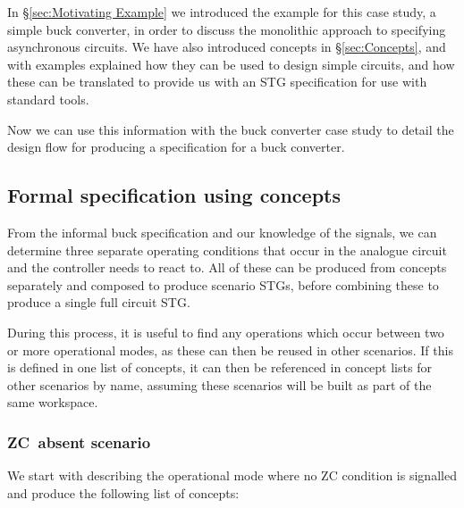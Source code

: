 \documentclass[british,compsoc]{IEEEtran}
\begin{document}
In \S\ref{sec:Motivating Example} we introduced the example for this case study, a simple buck converter,
in order to discuss the monolithic approach to specifying asynchronous circuits. We have also introduced concepts in \S\ref{sec:Concepts},
and with examples explained how they can be used to design simple circuits, and how these can be translated to
provide us with an STG specification for use with standard tools.

Now we can use this information with the buck converter case study to detail the design flow for producing a
specification for a buck converter.

\subsection{Formal specification using concepts}

From the informal buck specification and our knowledge of the signals,
we can determine three separate operating conditions that occur in
the analogue circuit and the controller needs to react to. All of
these can be produced from concepts separately and composed to produce
scenario STGs, before combining these to produce a single full circuit
STG.

During this process, it is useful to find any operations which occur
between two or more operational modes, as these can then be reused
in other scenarios. If this is defined in one list of concepts, it
can then be referenced in concept lists for other scenarios by name, assuming these scenarios will be built as part of the same workspace.

\subsubsection{ZC~absent scenario}

We start with describing the operational mode where no ZC condition
is signalled and produce the following list of concepts:
\end{document}

